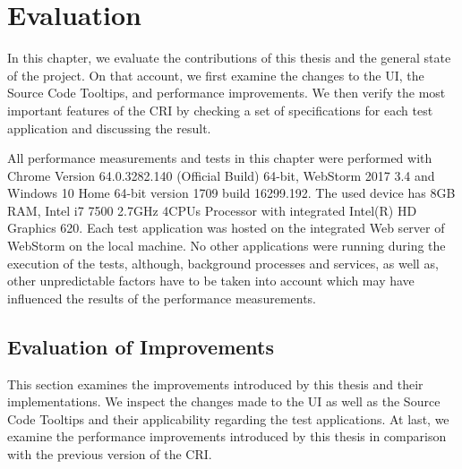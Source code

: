 \chapter{Evaluation}
\label{ch:Evaluation}
In this chapter, we evaluate the contributions of this thesis and the general state of the project. On that account, we first examine the changes to the UI, the Source Code Tooltips, and performance improvements. We then verify the most important features of the CRI by checking a set of specifications for each test application and discussing the result.

All performance measurements and tests in this chapter were performed with Chrome Version 64.0.3282.140 (Official Build) 64-bit, WebStorm 2017 3.4 and Windows 10 Home 64-bit version 1709 build 16299.192. The used device has 8GB RAM, Intel i7 7500 2.7GHz 4CPUs Processor with integrated Intel(R) HD Graphics 620. Each test application was hosted on the integrated Web server of WebStorm on the local machine. No other applications were running during the execution of the tests, although, background processes and services, as well as, other unpredictable factors have to be taken into account which may have influenced the results of the performance measurements.

\section{Evaluation of Improvements}
This section examines the improvements introduced by this thesis and their implementations. We inspect the changes made to the UI as well as the Source Code Tooltips and their applicability regarding the test applications. At last, we examine the performance improvements introduced by this thesis in comparison with the previous version of the CRI.

